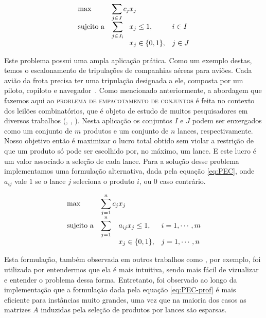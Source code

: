 \documentclass{article}
\begin{document}
	\begin{equation}
		\label{eq:PEC-prof}
        \begin{array}{ll@{}ll}
            \text{max}  & \displaystyle\sum\limits_{j \in J} c_{j}&x_{j} &\\
            \text{sujeito a}& \displaystyle\sum\limits_{j \in J_i}   &x_{j} \leq 1,  &i \in I\\
                 &                                                &x_{j} \in \{0,1\}, &j \in J
        \end{array}
    \end{equation}
    
	Este problema possui uma ampla aplicação prática. Como um exemplo destas, temos o escalonamento de tripulações de companhias aéreas para aviões. Cada avião da frota precisa ter uma tripulação designada a ele, composta por um piloto, copiloto e navegador~\cite{Airline}.    
    Como mencionado anteriormente, a abordagem que fazemos aqui ao \textsc{problema de empacotamento de conjuntos} é feita no contexto dos leilões combinatórios, que é objeto de estudo de muitos pesquisadores em diversos trabalhos (\cite{Winner}, \cite{Taming}, \cite{CABOB}). Nesta aplicação os conjuntos $I$ e $J$ podem ser enxergados como um conjunto de $m$ produtos e um conjunto de $n$ lances, respectivamente. Nosso objetivo então é maximizar o lucro total obtido sem violar a restrição de que um produto só pode ser escolhido por, no máximo, um lance. E este lucro é um valor associado a seleção de cada lance. 
    Para a solução desse problema implementamos uma formulação alternativa, dada pela equação \ref{eq:PEC}, onde $ a_{ij} $ vale $ 1 $ se o lance $ j $ seleciona o produto $ i $, ou $ 0 $ caso contrário.
    
    \begin{equation}
    	\label{eq:PEC}
    	\begin{array}{ll@{}ll}
    		\text{max}  & \displaystyle\sum\limits_{j = 1}^{n} c_{j} & x_{j} &\\
    		\text{sujeito a}& \displaystyle\sum\limits_{j = 1}^{n}   & a_{ij}x_{j} \leq 1,  & i=1,\cdots,m\\
    		&                                                &x_{j} \in \{0,1\}, & j = 1,\cdots,n
    	\end{array}
    \end{equation}
    
    Esta formulação, também observada em outros trabalhos como \cite{guo2005using}, por exemplo, foi utilizada por entendermos que ela é mais intuitiva, sendo mais fácil de vizualizar e entender o problema dessa forma. Entretanto, foi observado ao longo da implementação que a formulação dada pela equação \ref{eq:PEC-prof} é mais eficiente para instâncias muito grandes, uma vez que na maioria dos casos as matrizes $ A $ induzidas pela seleção de produtos por lances são esparsas. 
	
\end{document}
